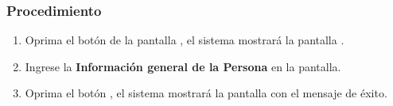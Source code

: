 \subsubsection{Procedimiento}
\begin{enumerate}
	\item Oprima el botón  de la pantalla , el sistema mostrará la pantalla . 

	
	\item Ingrese la \textbf{Información general de la Persona} en la pantalla.
	
	\item Oprima el botón , el sistema mostrará la pantalla  con el mensaje de éxito.
\end{enumerate}

